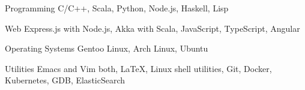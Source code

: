 


\begin{cvskills}


  \cvskill
  {Programming}
  {C/C++, Scala, Python, Node.js, Haskell, Lisp}


  \cvskill
  {Web}
  {Express.js with Node.js, Akka with Scala, JavaScript, TypeScript, Angular}


  \cvskill
  {Operating Systems}
  {Gentoo Linux, Arch Linux, Ubuntu}

  \cvskill
  {Utilities}
  {Emacs and Vim both, \LaTeX, Linux shell utilities, Git, Docker,
    Kubernetes, GDB, ElasticSearch}


\end{cvskills}


